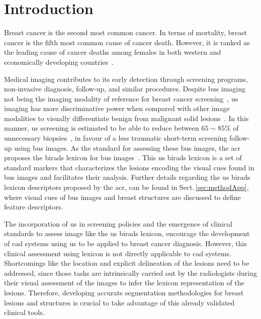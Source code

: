 \graphicspath{ {./content/intro/figures/} }

\section{Introduction}
\label{sec:intro}  %


Breast cancer is the second most common cancer.
In terms of mortality, breast cancer is the fifth most common cause of cancer death.
However, it is ranked as the leading cause of cancer deaths among females in both western and economically developing countries~\cite{cancerStatistics2011}.

Medical imaging contributes to its early detection through screening programs, non-invasive diagnosis, follow-up, and similar procedures.
Despite \ac{bus} imaging not being the imaging modality of reference for breast cancer screening~\cite{smith2003american}, \ac{us} imaging has more discriminative power when compared with other image modalities to visually differentiate benign from malignant solid lesions~\cite{Stavros:1995p12392}.
In this manner, \ac{us} screening is estimated to be able to reduce
between $65\sim85\%$ of unnecessary biopsies~\cite{yuan2010multimodality}, in favour of a less traumatic short-term screening follow-up using \ac{bus} images.
As the standard for assessing these \ac{bus} images, the \ac{acr} proposes the \ac{birads} lexicon for \ac{bus} images~\cite{biradsus}.
This \ac{us} \ac{birads} lexicon is a set of standard markers that characterizes the lesions encoding the visual cues found in \ac{bus} images and facilitates their analysis.
Further details regarding the \ac{us} \ac{birads} lexicon descriptors proposed by the \ac{acr}, can be found in Sect.\,\ref{sec:methodApp}, where visual cues of \ac{bus} images and breast structures are discussed to define feature descriptors.

The incorporation of \ac{us} in screening policies and the emergence of clinical standards to assess image like the \ac{us} \ac{birads} lexicon, encourage the development of \ac{cad} systems using \ac{us} to be applied to breast cancer diagnosis.
However, this clinical assessment using lexicon is not directly applicable to \ac{cad} systems.
Shortcomings like the location and explicit delineation of the lesions need to be addressed, since those tasks are intrinsically carried out by the radiologists during their visual assessment of the images to infer the lexicon representation of the lesions.
Therefore, developing accurate segmentation methodologies for breast lesions and structures is crucial to take advantage of this already validated clinical tools.

